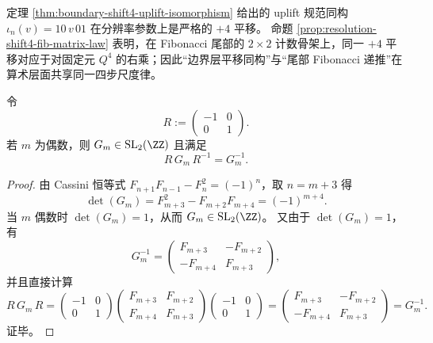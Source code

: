 \begin{remark}\label{rem:shift4-uplift-q4-arithmetic-shadow}
定理 \ref{thm:boundary-shift4-uplift-isomorphism} 给出的 uplift 规范同构 \(\iota_n(v)=10\,v\,01\) 在分辨率参数上是严格的 \(+4\) 平移。
命题 \ref{prop:resolution-shift4-fib-matrix-law} 表明，在 Fibonacci 尾部的 \(2\times 2\) 计数骨架上，同一 \(+4\) 平移对应于对固定元 \(Q^4\) 的右乘；因此“边界层平移同构”与“尾部 Fibonacci 递推”在算术层面共享同一四步尺度律。
\end{remark}

\begin{proposition}\label{prop:fib-tail-reversibility}
令
\[
R:=\begin{pmatrix}-1&0\\[2pt]0&1\end{pmatrix}.
\]
若 \(m\) 为偶数，则 \(G_m\in \mathrm{SL}_2(\ZZ)\) 且满足
\[
R\,G_m\,R^{-1}=G_m^{-1}.
\]
\end{proposition}
\begin{proof}
由 Cassini 恒等式 \(F_{n+1}F_{n-1}-F_n^2=(-1)^n\)，取 \(n=m+3\) 得
\[
\det(G_m)=F_{m+3}^2-F_{m+2}F_{m+4}=(-1)^{m+4}.
\]
当 \(m\) 偶数时 \(\det(G_m)=1\)，从而 \(G_m\in\mathrm{SL}_2(\ZZ)\)。
又由于 \(\det(G_m)=1\)，有
\[
G_m^{-1}=\begin{pmatrix}F_{m+3}&-F_{m+2}\\[2pt]-F_{m+4}&F_{m+3}\end{pmatrix},
\]
并且直接计算
\[
R\,G_m\,R
=
\begin{pmatrix}-1&0\\[2pt]0&1\end{pmatrix}
\begin{pmatrix}F_{m+3}&F_{m+2}\\[2pt]F_{m+4}&F_{m+3}\end{pmatrix}
\begin{pmatrix}-1&0\\[2pt]0&1\end{pmatrix}
=
\begin{pmatrix}F_{m+3}&-F_{m+2}\\[2pt]-F_{m+4}&F_{m+3}\end{pmatrix}
=G_m^{-1}.
\]
证毕。
\end{proof}

